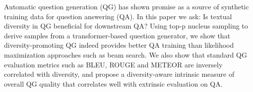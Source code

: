 Automatic question generation (QG) has shown promise as a source of synthetic training data for question answering (QA). In this paper we ask: Is textual diversity in QG beneficial for downstream QA? Using top-p nucleus sampling to derive samples from a transformer-based question generator, we show that diversity-promoting QG indeed provides better QA training than likelihood maximization approaches such as beam search. We also show that standard QG evaluation metrics such as BLEU, ROUGE and METEOR are inversely correlated with diversity, and propose a diversity-aware intrinsic measure of overall QG quality that correlates well with extrinsic evaluation on QA.
